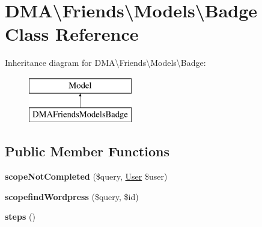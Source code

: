 \hypertarget{classDMA_1_1Friends_1_1Models_1_1Badge}{\section{D\-M\-A\textbackslash{}Friends\textbackslash{}Models\textbackslash{}Badge Class Reference}
\label{classDMA_1_1Friends_1_1Models_1_1Badge}
}
Inheritance diagram for D\-M\-A\textbackslash{}Friends\textbackslash{}Models\textbackslash{}Badge\-:\begin{figure}[H]
\begin{center}
\leavevmode
\includegraphics[height=2.000000cm]{df/d98/classDMA_1_1Friends_1_1Models_1_1Badge}
\end{center}
\end{figure}
\subsection*{Public Member Functions}
\begin{DoxyCompactItemize}
\item 
\hypertarget{classDMA_1_1Friends_1_1Models_1_1Badge_a65fc600bfefbedc8d7393ec86c848a51}{{\bfseries scope\-Not\-Completed} (\$query, \hyperlink{classDMA_1_1Friends_1_1Models_1_1User}{User} \$user)}\label{classDMA_1_1Friends_1_1Models_1_1Badge_a65fc600bfefbedc8d7393ec86c848a51}

\item 
\hypertarget{classDMA_1_1Friends_1_1Models_1_1Badge_a5ebdc91135362ca2b0225fdb0c965127}{{\bfseries scopefind\-Wordpress} (\$query, \$id)}\label{classDMA_1_1Friends_1_1Models_1_1Badge_a5ebdc91135362ca2b0225fdb0c965127}

\item 
\hypertarget{classDMA_1_1Friends_1_1Models_1_1Badge_ac40fb9fa1c7f70f29bb90e77b8f9c8aa}{{\bfseries steps} ()}\label{classDMA_1_1Friends_1_1Models_1_1Badge_ac40fb9fa1c7f70f29bb90e77b8f9c8aa}

\end{DoxyCompactItemize}
